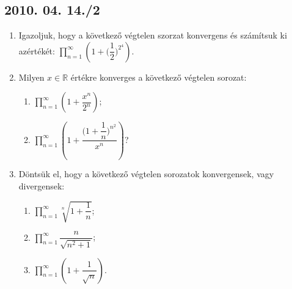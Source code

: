 \documentclass{article}
\newenvironment{abc}{\begin{enumerate}[label=\textit{\alph*})]}{\end{enumerate}}
\begin{document}
\subsection*{2010. 04. 14./2}
\begin{enumerate}
\item Igazoljuk, hogy a következő végtelen szorzat konvergens és számítsuk ki azértékét: $\displaystyle\prod_{n=1}^{\infty} \left(1+\Big( \dfrac{1}{2}\Big) ^{2^4}\right)$.
\item Milyen $x\in\mathbb{R}$ értékre konverges a következő végtelen sorozat:
	\begin{abc}
	\item $\displaystyle\prod_{n=1}^{\infty} \left(1+\dfrac{x^n}{2^n}\right)$;
    \item $\displaystyle\prod_{n=1}^{\infty}\left(1+\dfrac{\Big(1+\dfrac{1}{n}\Big)^{n^2}}{x^n}\right)$?
	\end{abc}
\item Döntsük el, hogy a következő végtelen sorozatok konvergensek, vagy divergensek:
	\begin{abc}
	\item $\displaystyle\prod_{n=1}^{\infty}\sqrt[n]{1+\dfrac{1}{n}}$;
    \item $\displaystyle\prod_{n=1}^{\infty}\dfrac{n}{\sqrt{n^2+1}}$;
	\item $\displaystyle\prod_{n=1}^{\infty}\left(1+\dfrac{1}{\sqrt{n}}\right)$.    
	\end{abc}

\end{enumerate}
\end{document}
